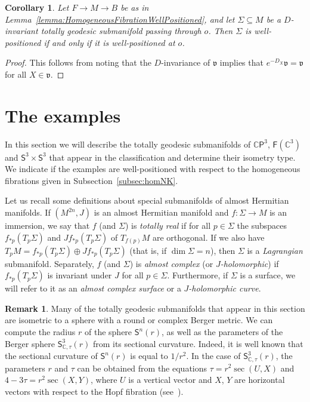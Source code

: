 \documentclass[11pt,a4paper,final]{amsart}
\newcommand{\s}{\mathsf}
\newcommand{\g}{\mathfrak}
\newcommand{\C}{\mathbb{C}}
\newtheorem{corollary}[theorem]{Corollary}
\theoremstyle{definition}
\newtheorem{remark}[theorem]{Remark}
\begin{document}
\begin{corollary}\label{cor:CanonicallyEmbeddedWellPositioned}
	Let $F\to M \to B$ be as in Lemma~\ref{lemma:HomogeneousFibrationWellPositioned}, and let $\Sigma\subseteq M$ be a $D$-invariant totally geodesic submanifold passing through $o$.
	Then $\Sigma$ is well-positioned if and only if it is well-positioned at $o$.
\end{corollary}

\begin{proof}
	This follows from noting that the $D$-invariance of $\g{v}$ implies that $e^{-D_{X}}\g{v}=\g{v}$ for all $X\in\g{v}$. \qedhere
\end{proof}



\section{The examples}\label{sec:examples}
	
In this section we will describe the totally geodesic submanifolds of $\C\s{P}^{3}$, $\s{F}(\C^{3})$ and $\s{S}^{3}\times\s{S}^{3}$ that appear in the classification and determine their isometry type.
We indicate if the examples are well-positioned with respect to the homogeneous fibrations given in Subsection~\ref{subsec:homNK}.
	
Let us recall some definitions about special submanifolds of almost Hermitian manifolds.	
If $(M^{2n},J)$ is an almost Hermitian manifold and $f\colon \Sigma\to M$ is an immersion, we say that $f$ (and $\Sigma$) is \textit{totally real} if for all $p\in \Sigma$ the subspaces $f_{*p}(T_p\Sigma)$ and $Jf_{*p}(T_p\Sigma)$ of $T_{f(p)}M$ are orthogonal.
If we also have $T_{p}M=f_{*p}(T_p\Sigma)\oplus Jf_{*p}(T_p\Sigma)$ (that is, if $\dim\Sigma = n$), then $\Sigma$ is a \textit{Lagrangian} submanifold.
Separately, $f$ (and $\Sigma$) is \textit{almost complex} (or $J$\textit{-holomorphic}) if $f_{*p}(T_p\Sigma)$ is invariant under $J$ for all $p\in\Sigma$.
Furthermore, if $\Sigma$ is a surface, we will refer to it as an \textit{almost complex surface} or a $J$\textit{-holomorphic curve}.
\begin{remark}
	Many of the totally geodesic submanifolds that appear in this section are isometric to a sphere with a round or complex Berger metric.
	We can compute the radius $r$ of the sphere $\s{S}^{n}(r)$, as well as the parameters of the Berger sphere $\s{S}^{3}_{\C,\tau}(r)$ from its sectional curvature. 
	Indeed, it is well known that the sectional curvature of $\s{S}^{n}(r)$ is equal to $1/r^{2}$.
	In the case of $\s{S}^{3}_{\C,\tau}(r)$, the parameters $r$ and $\tau$ can be obtained from the equations $\tau=r^{2}\sec(U,X)$ and
	$4-3\tau=r^{2}\sec(X,Y)$,
	where $U$ is a vertical vector and $X$, $Y$ are horizontal vectors with respect to the Hopf fibration (see~\cite{GorodskiKollrossRV}).
\end{remark}
		
\end{document}
